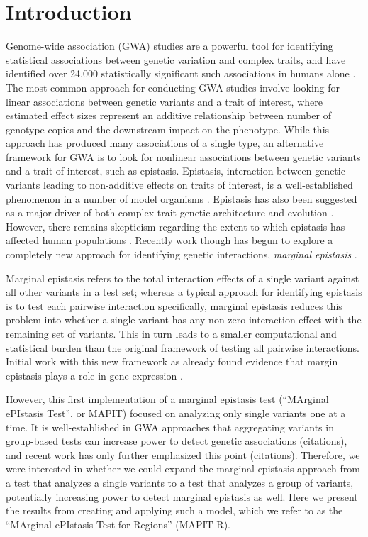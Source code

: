 \documentclass[12pt,a4paper]{article}
\begin{document}
\linenumbers

\section{Introduction}\label{InterPath-Introduction}

Genome-wide association (GWA) studies are a powerful tool for identifying statistical associations between genetic variation and complex traits, and have identified over 24,000 statistically significant such associations in humans alone \citep{Buniello2019}. The most common approach for conducting GWA studies involve looking for linear associations between genetic variants and a trait of interest, where estimated effect sizes represent an additive relationship between number of genotype copies and the downstream impact on the phenotype. While this approach has produced many associations of a single type, an alternative framework for GWA is to look for nonlinear associations between genetic variants and a trait of interest, such as epistasis. Epistasis, interaction between genetic variants leading to non-additive effects on traits of interest, is a well-established phenomenon in a number of model organisms \citep{Lehner2006,Rowe2008,Shao2008,Flint2009,Costanzo2010,He2010,Jarvis2011,Pettersson2011,Bloom2013,Monnahan2015}. Epistasis has also been suggested as a major driver of both complex trait genetic architecture and evolution \citep{Carlborg2004,Carlborg2006,Martin2007,Phillips2008,Moore2009,Jones2014,Mackay2014}. However, there remains skepticism regarding the extent to which epistasis has affected human populations \citep{Hill2008,Crow2010,Aschard2012,Wood2014,Yang2015}. Recently work though has begun to explore a completely new approach for identifying genetic interactions, \textit{marginal epistasis} \citep{Crawford2017a}.

Marginal epistasis refers to the total interaction effects of a single variant against all other variants in a test set; whereas a typical approach for identifying epistasis is to test each pairwise interaction specifically, marginal epistasis reduces this problem into whether a single variant has any non-zero interaction effect with the remaining set of variants. This in turn leads to a smaller computational and statistical burden than the original framework of testing all pairwise interactions. Initial work with this new framework as already found evidence that margin epistasis plays a role in gene expression \citep{Crawford2017a}. 

However, this first implementation of a marginal epistasis test (``MArginal ePIstasis Test'', or MAPIT) focused on analyzing only single variants one at a time. It is well-established in GWA approaches that aggregating variants in group-based tests can increase power to detect genetic associations (citations), and recent work has only further emphasized this point (citations). Therefore, we were interested in whether we could expand the marginal epistasis approach from a test that analyzes a single variants to a test that analyzes a group of variants, potentially increasing power to detect marginal epistasis as well. Here we present the results from creating and applying such a model, which we refer to as the ``MArginal ePIstasis Test for Regions'' (MAPIT-R). 
\end{document}
